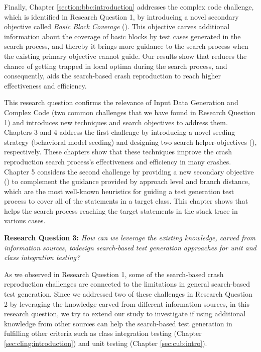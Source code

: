 Finally, Chapter \ref{section:bbc:introduction} addresses the complex code challenge, which is identified in Research Question 1, by introducing a novel secondary objective called \textit{Basic Block Coverage} (\bbc). This objective carves additional information about the coverage of basic blocks by test cases generated in the search process, and thereby it brings more guidance to the search process when the existing primary objective cannot guide. Our results show that \bbc reduces the chance of getting trapped in local optima during the search process, and consequently, aids the search-based crash reproduction to reach higher effectiveness and efficiency.

This research question confirms the relevance of Input Data Generation and Complex Code (two common challenges that we have found in Research Question 1) and introduces new techniques and search objectives to address them. Chapters 3 and 4 address the first challenge by introducing a novel seeding strategy (behavioral model seeding) and designing two search helper-objectives (\moho), respectively. These chapters show that these techniques improve the crash reproduction search process's effectiveness and efficiency in many crashes.
Chapter 5 considers the second challenge by providing a new secondary objective (\bbc) to complement the guidance provided by approach level and branch distance, which are the most well-known heuristics for guiding a test generation test process to cover all of the statements in a target class. This chapter shows that \bbc helps the search process reaching the target statements in the stack trace in various cases.


\textbf{Research Question 3: }\textit{How can we leverage the existing knowledge, carved from information sources, todesign search-based test generation approaches for unit and class integration testing?}

As we observed in Research Question 1, some of the search-based crash reproduction challenges are connected to the limitations in general search-based test generation. Since we addressed two of these challenges in Research Question 2 by leveraging the knowledge carved from different information sources, in this research question, we try to extend our study to investigate if using additional knowledge from other sources can help the search-based test generation in fulfilling other criteria such as class integration testing (Chapter \ref{sec:cling:introduction}) and unit testing (Chapter \ref{sec:cub:intro}).

